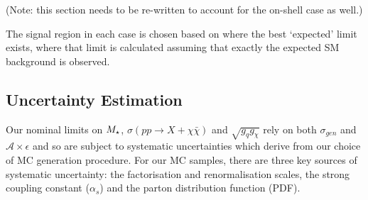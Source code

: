 (Note: this section needs to be re-written to account for the on-shell case as well.)

The signal region in each case is chosen based on where the best `expected' limit exists, where that limit is calculated assuming that exactly the expected SM background is observed.





\subsection{Uncertainty Estimation}
Our nominal limits on $M_{\star}$, $\sigma(pp \rightarrow{X} + \chi\bar{\chi})$ and $\sqrt{g_{q}g_{\chi}}$ rely on both $\sigma_{gen}$ and $\mathcal{A}\times\epsilon$ and so are subject to systematic uncertainties which derive from our choice of MC generation procedure. For our MC samples, there are three key sources of systematic uncertainty: the factorisation and renormalisation scales, the strong coupling constant ($\alpha_{s}$) and the parton distribution function (PDF).


